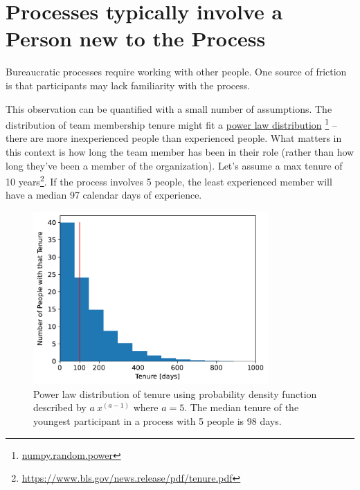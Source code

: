 \section{Processes typically involve a Person new to the Process}


Bureaucratic processes require working with other people. One source of friction is that participants may lack familiarity with the process. 

This observation can be quantified with a small number of assumptions. The distribution of team membership tenure might fit a \href{https://en.wikipedia.org/wiki/Power_law}{power law distribution}
\footnote{\href{https://numpy.org/doc/stable/reference/random/generated/numpy.random.power.html}{numpy.random.power}}
-- there are more inexperienced people than experienced people. What matters in this context is how long the team member has been in their role (rather than how long they've been a member of the organization). Let's assume a max tenure of 10 years\footnote{\href{https://www.bls.gov/news.release/pdf/tenure.pdf}{https://www.bls.gov/news.release/pdf/tenure.pdf}}. If the process involves 5 people, the least experienced member will have a median 97 calendar days of experience.

\begin{figure}[H]
    \centering
    \includegraphics[width=0.8\textwidth]{images/tenure_power_distribution_a5_with_max_tenure10_and_5_participants.pdf}
    \caption{Power law distribution of tenure using probability density function described by $a\ x^{(a-1)}$ where $a=5$. The median tenure of the youngest participant  in a process with 5 people is 98 days.}
    \label{fig:tenure-powerlaw-5-participants-tenure10}
\end{figure}


